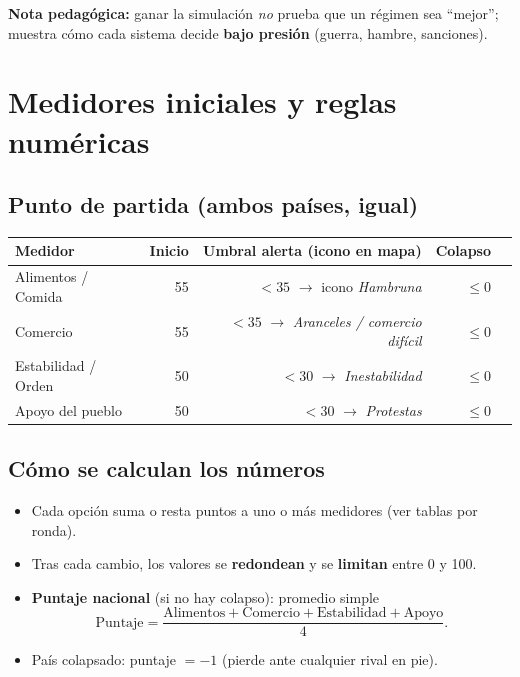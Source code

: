 \documentclass[11pt,a4paper]{article}
\begin{document}
\vspace{0.8em}
\textbf{Nota pedagógica:} ganar la simulación \emph{no} prueba que un régimen sea ``mejor''; muestra cómo cada sistema decide \textbf{bajo presión} (guerra, hambre, sanciones).

\section{Medidores iniciales y reglas numéricas}

\subsection{Punto de partida (ambos países, igual)}

\begin{center}
\renewcommand{\arraystretch}{1.35}
\begin{tabular}{lrrrr}
\toprule
\textbf{Medidor} & \textbf{Inicio} & \textbf{Umbral alerta (icono en mapa)} & \textbf{Colapso} \\
\midrule
Alimentos / Comida & 55 & $< 35$ $\rightarrow$ icono \emph{Hambruna} & $\leq 0$ \\
Comercio & 55 & $< 35$ $\rightarrow$ \emph{Aranceles / comercio difícil} & $\leq 0$ \\
Estabilidad / Orden & 50 & $< 30$ $\rightarrow$ \emph{Inestabilidad} & $\leq 0$ \\
Apoyo del pueblo & 50 & $< 30$ $\rightarrow$ \emph{Protestas} & $\leq 0$ \\
\bottomrule
\end{tabular}
\end{center}

\subsection{Cómo se calculan los números}

\begin{itemize}
  \item Cada opción suma o resta puntos a uno o más medidores (ver tablas por ronda).
  \item Tras cada cambio, los valores se \textbf{redondean} y se \textbf{limitan} entre 0 y 100.
  \item \textbf{Puntaje nacional} (si no hay colapso): promedio simple
    \[
      \text{Puntaje} = \frac{\text{Alimentos} + \text{Comercio} + \text{Estabilidad} + \text{Apoyo}}{4}.
    \]
  \item País colapsado: puntaje $= -1$ (pierde ante cualquier rival en pie).
\end{itemize}
\end{document}

